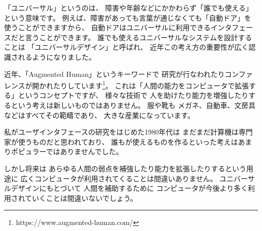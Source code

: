 \documentclass[topics]{compsoft} %
\begin{document}
「ユニバーサル」というのは、
障害や年齢などにかかわらず「誰でも使える」という意味です。
例えば、障害があっても言葉が通じなくても「自動ドア」を使うことができますから、
自動ドアはユニバーサルに利用できるインタフェースだと言うことができます。
%
誰でも使えるユニバーサルなシステムを設計することは
「ユニバーサルデザイン」と呼ばれ、
近年この考え方の重要性が広く認識されるようになりました。




近年、「Augmented Human」というキーワードで
研究が行なわれたりコンファレンスが開かれたりしています\footnote{
  \textsf{https:{\slash}{\slash}www.augmented-human.com{\slash}}
}。
これは「人間の能力をコンピュータで拡張する」というコンセプトですが、
様々な技術で
人を助けたり能力を増強したりするという考えは新しいものではありません。
服や靴も
メガネ、自動車、文房具などはすべてその範疇であり、
大きな産業になっています。

私がユーザインタフェースの研究をはじめた1980年代は
まだまだ計算機は専門家が使うものだと思われており、
誰もが使えるものを作るといった考えはあまりポピュラーではありませんでした。

しかし将来は
あらゆる人間の弱点を補強したり能力を拡張したりするという用途に
広くコンピュータが利用されてくることは間違いありません。
ユニバーサルデザインにもとづいて
人間を補助するために
コンピュータが今後より多く利用されていくことは間違いないでしょう。
\end{document}
